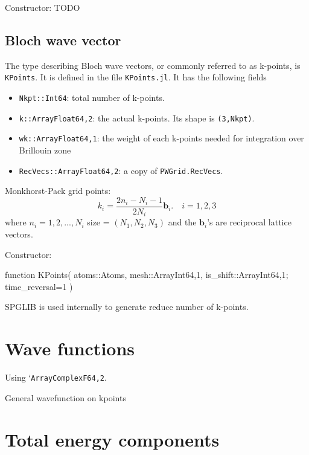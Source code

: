 \documentclass[a4paper,10pt]{paper}
\newcommand{\jlcode}[1]{\texttt{#1}}
\begin{document}
Constructor: TODO

\subsection{Bloch wave vector}

The type describing Bloch wave vectors, or commonly referred
to as k-points, is \jlcode{KPoints}. It is defined in the file
\jlcode{KPoints.jl}. It has the following fields
%
\begin{itemize}
%
\item \jlcode{Nkpt::Int64}: total number of k-points.
%
\item \jlcode{k::Array{Float64,2}}: the actual k-points.
  Its shape is \jlcode{(3,Nkpt)}.
%
\item \jlcode{wk::Array{Float64,1}}: the weight of each k-points needed
  for integration over Brillouin zone
%
\item \jlcode{RecVecs::Array{Float64,2}}: a copy of \jlcode{PWGrid.RecVecs}.
\end{itemize}

Monkhorst-Pack grid points:
%
\begin{equation}
k_{i} = \frac{2n_i -N_i - 1}{2N_i} \mathbf{b}_i.\hspace{1em}
i = 1,2,3
\end{equation}
%
where $n_i=1,2,...,N_{i}$
size = \((N_1, N_2, N_3)\) and the \(\mathbf{b}_i\)'s are reciprocal lattice vectors.


Constructor:

\begin{juliacode}
function KPoints( atoms::Atoms, mesh::Array{Int64,1}, is_shift::Array{Int64,1};
                  time_reversal=1 )
\end{juliacode}

SPGLIB is used internally to generate reduce number of k-points.



\section{Wave functions}

Using `\jlcode{Array{ComplexF64,2}}.

General wavefunction on kpoints


\section{Total energy components}
\end{document}
